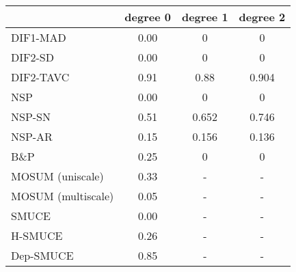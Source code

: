 \begin{tabular}{|l|c|c|c|}
  \hline
 & degree 0 & degree 1 & degree 2 \\ 
  \hline
DIF1-MAD & 0.00 & 0 & 0 \\ 
  DIF2-SD & 0.00 & 0 & 0 \\ 
  DIF2-TAVC & 0.91 & 0.88 & 0.904 \\ 
  NSP & 0.00 & 0 & 0 \\ 
  NSP-SN & 0.51 & 0.652 & 0.746 \\ 
  NSP-AR & 0.15 & 0.156 & 0.136 \\ 
  B\&P & 0.25 & 0 & 0 \\ 
  MOSUM (uniscale) & 0.33 & - & - \\ 
  MOSUM (multiscale) & 0.05 & - & - \\ 
  SMUCE & 0.00 & - & - \\ 
  H-SMUCE & 0.26 & - & - \\ 
  Dep-SMUCE & 0.85 & - & - \\ 
   \hline
\end{tabular}
